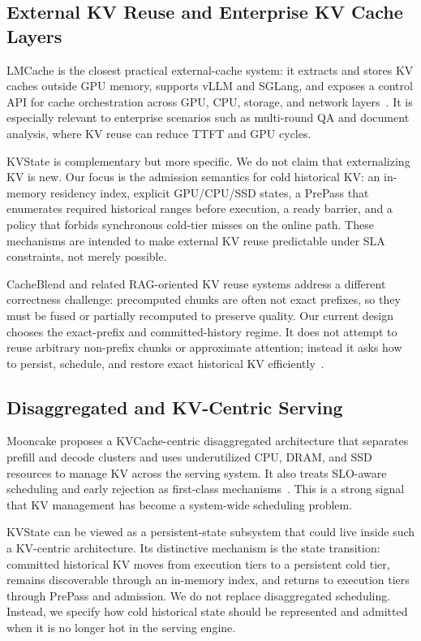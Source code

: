\documentclass[sigconf,review,anonymous]{acmart}
\newcommand{\system}{KVState\xspace}
\begin{document}
\subsection{External KV Reuse and Enterprise KV Cache Layers}

LMCache is the closest practical external-cache system: it extracts and stores
KV caches outside GPU memory, supports vLLM and SGLang, and exposes a control
API for cache orchestration across GPU, CPU, storage, and network
layers~\citep{liu2025lmcache}. It is especially relevant to enterprise
scenarios such as multi-round QA and document analysis, where KV reuse can
reduce TTFT and GPU cycles.

\system is complementary but more specific. We do not claim that externalizing
KV is new. Our focus is the admission semantics for cold historical KV: an
in-memory residency index, explicit GPU/CPU/SSD states, a PrePass that
enumerates required historical ranges before execution, a ready barrier, and a
policy that forbids synchronous cold-tier misses on the online path. These
mechanisms are intended to make external KV reuse predictable under SLA
constraints, not merely possible.

CacheBlend and related RAG-oriented KV reuse systems address a different
correctness challenge: precomputed chunks are often not exact prefixes, so they
must be fused or partially recomputed to preserve quality. Our current design
chooses the exact-prefix and committed-history regime. It does not attempt to
reuse arbitrary non-prefix chunks or approximate attention; instead it asks how
to persist, schedule, and restore exact historical KV
efficiently~\citep{yao2024cacheblend}.

\subsection{Disaggregated and KV-Centric Serving}

Mooncake proposes a KVCache-centric disaggregated architecture that separates
prefill and decode clusters and uses underutilized CPU, DRAM, and SSD resources
to manage KV across the serving system. It also treats SLO-aware scheduling and
early rejection as first-class mechanisms~\citep{qin2024mooncake}. This is a
strong signal that KV management has become a system-wide scheduling problem.

\system can be viewed as a persistent-state subsystem that could live inside such
a KV-centric architecture. Its distinctive mechanism is the state transition:
committed historical KV moves from execution tiers to a persistent cold tier,
remains discoverable through an in-memory index, and returns to execution tiers
through PrePass and admission. We do not replace disaggregated scheduling.
Instead, we specify how cold historical state should be represented and admitted
when it is no longer hot in the serving engine.
\end{document}
